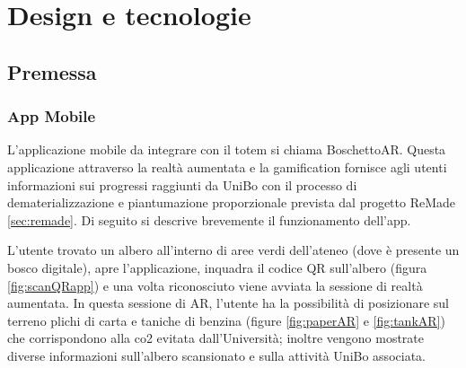 \chapter{Design e tecnologie}
\section{Premessa}
\subsection{App Mobile}
L'applicazione mobile da integrare con il totem si chiama BoschettoAR. Questa applicazione attraverso la realtà aumentata e la gamification fornisce agli utenti informazioni sui progressi raggiunti da UniBo con il processo di dematerializzazione e piantumazione proporzionale prevista dal progetto ReMade \ref{sec:remade}. Di seguito si descrive brevemente il funzionamento dell'app.

L'utente trovato un albero all'interno di aree verdi dell'ateneo (dove è presente un bosco digitale), apre l'applicazione, inquadra il codice QR sull'albero (figura \ref{fig:scanQRapp}) e una volta riconosciuto viene avviata la sessione di realtà aumentata. In questa sessione di AR, l'utente ha la possibilità di posizionare sul terreno plichi di carta e taniche di benzina (figure \ref{fig:paperAR} e \ref{fig:tankAR}) che corrispondono alla co2 evitata dall'Università; inoltre vengono mostrate diverse informazioni sull'albero scansionato e sulla attività UniBo associata.

